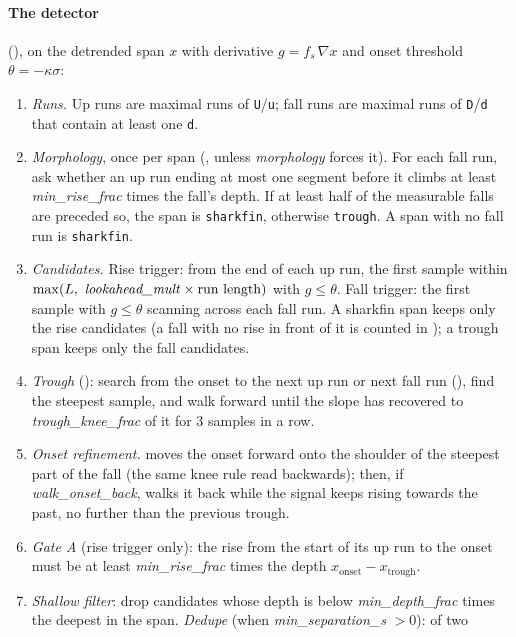 \paragraph{The detector} (), on the detrended span $x$ with
derivative $g = f_s\,\nabla x$ and onset threshold $\theta = -\kappa\sigma$:
\begin{enumerate}
\item \emph{Runs.} Up runs are maximal runs of \texttt{U}/\texttt{u}; fall runs are maximal
  runs of \texttt{D}/\texttt{d} that contain at least one \texttt{d}.
\item \emph{Morphology}, once per span (, unless
  \emph{morphology} forces it). For each fall run, ask whether an up run ending at most one
  segment before it climbs at least \emph{min\_rise\_frac} times the fall's depth. If at least
  half of the measurable falls are preceded so, the span is \texttt{sharkfin}, otherwise
  \texttt{trough}. A span with no fall run is \texttt{sharkfin}.
\item \emph{Candidates.} Rise trigger: from the end of each up run, the first sample within
  $\max(L,\ \text{\emph{lookahead\_mult}}\times\text{run length})$ with $g \le \theta$. Fall
  trigger: the first sample with $g \le \theta$ scanning across each fall run. A sharkfin span
  keeps only the rise candidates (a fall with no rise in front of it is counted in
  ); a trough span keeps only the fall candidates.
\item \emph{Trough} (): search from the onset to the next up run or next
  fall run (), find the steepest sample, and walk forward until the slope
  has recovered to \emph{trough\_knee\_frac} of it for 3 samples in a row.
\item \emph{Onset refinement.}  moves the onset forward onto the
  shoulder of the steepest part of the fall (the same knee rule read backwards); then, if
  \emph{walk\_onset\_back},  walks it back while the signal keeps
  rising towards the past, no further than the previous trough.
\item \emph{Gate A} (rise trigger only): the rise from the start of its up run to the onset
  must be at least \emph{min\_rise\_frac} times the depth $x_\text{onset}-x_\text{trough}$.
\item \emph{Shallow filter}: drop candidates whose depth is below \emph{min\_depth\_frac}
  times the deepest in the span. \emph{Dedupe} (when \emph{min\_separation\_s} $>0$): of two

\end{enumerate}
